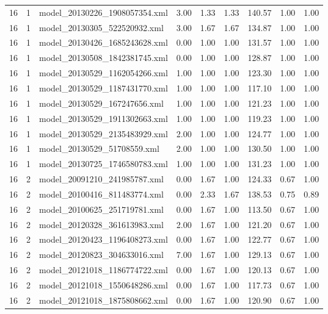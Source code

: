 \begin{table}[ht]
\begin{tabular}{rrlrrrrrr}
   16 &   1 & model\_20130226\_1908057354.xml & 3.00 & 1.33 & 1.33 & 140.57 & 1.00 & 1.00 \\ 
   16 &   1 & model\_20130305\_522520932.xml & 3.00 & 1.67 & 1.67 & 134.87 & 1.00 & 1.00 \\ 
   16 &   1 & model\_20130426\_1685243628.xml & 0.00 & 1.00 & 1.00 & 131.57 & 1.00 & 1.00 \\ 
   16 &   1 & model\_20130508\_1842381745.xml & 0.00 & 1.00 & 1.00 & 128.87 & 1.00 & 1.00 \\ 
   16 &   1 & model\_20130529\_1162054266.xml & 1.00 & 1.00 & 1.00 & 123.30 & 1.00 & 1.00 \\ 
   16 &   1 & model\_20130529\_1187431770.xml & 1.00 & 1.00 & 1.00 & 117.10 & 1.00 & 1.00 \\ 
   16 &   1 & model\_20130529\_167247656.xml & 1.00 & 1.00 & 1.00 & 121.23 & 1.00 & 1.00 \\ 
   16 &   1 & model\_20130529\_1911302663.xml & 1.00 & 1.00 & 1.00 & 119.23 & 1.00 & 1.00 \\ 
   16 &   1 & model\_20130529\_2135483929.xml & 2.00 & 1.00 & 1.00 & 124.77 & 1.00 & 1.00 \\ 
   16 &   1 & model\_20130529\_51708559.xml & 2.00 & 1.00 & 1.00 & 130.50 & 1.00 & 1.00 \\ 
   16 &   1 & model\_20130725\_1746580783.xml & 1.00 & 1.00 & 1.00 & 131.23 & 1.00 & 1.00 \\ 
   16 &   2 & model\_20091210\_241985787.xml & 0.00 & 1.67 & 1.00 & 124.33 & 0.67 & 1.00 \\ 
   16 &   2 & model\_20100416\_811483774.xml & 0.00 & 2.33 & 1.67 & 138.53 & 0.75 & 0.89 \\ 
   16 &   2 & model\_20100625\_251719781.xml & 0.00 & 1.67 & 1.00 & 113.50 & 0.67 & 1.00 \\ 
   16 &   2 & model\_20120328\_361613983.xml & 2.00 & 1.67 & 1.00 & 121.20 & 0.67 & 1.00 \\ 
   16 &   2 & model\_20120423\_1196408273.xml & 0.00 & 1.67 & 1.00 & 122.77 & 0.67 & 1.00 \\ 
   16 &   2 & model\_20120823\_304633016.xml & 7.00 & 1.67 & 1.00 & 129.13 & 0.67 & 1.00 \\ 
   16 &   2 & model\_20121018\_1186774722.xml & 0.00 & 1.67 & 1.00 & 120.13 & 0.67 & 1.00 \\ 
   16 &   2 & model\_20121018\_1550648286.xml & 0.00 & 1.67 & 1.00 & 117.73 & 0.67 & 1.00 \\ 
   16 &   2 & model\_20121018\_1875808662.xml & 0.00 & 1.67 & 1.00 & 120.90 & 0.67 & 1.00 \\ 

\end{tabular}
\end{table}
